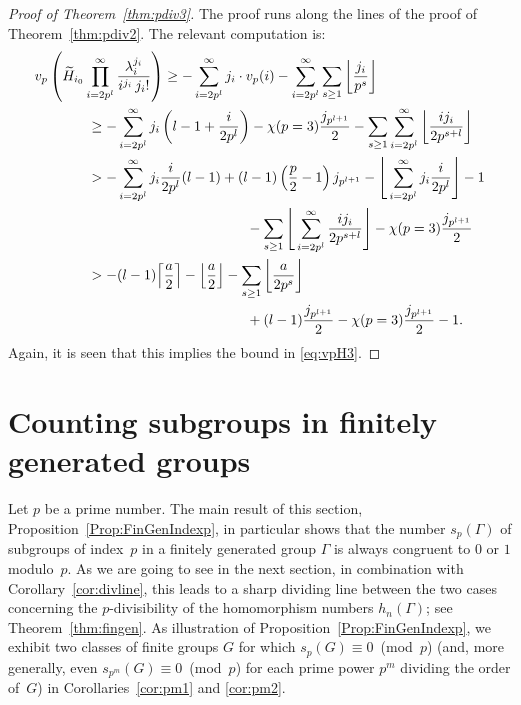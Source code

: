 \documentclass[12pt,reqno]{amsart}
\numberwithin{equation}{section}
\theoremstyle{remark}
\begin{document}
\begin{proof}[Proof of Theorem~{\em \ref{thm:pdiv3}}]
The proof runs along the lines of the proof of Theorem~\ref{thm:pdiv2}.
The relevant computation is:
\begin{align}
\notag
v_p&\left(\widetilde H_{i_0}
\prod _{i=2p^l} ^{\infty}
\frac {{\lambda}_i^{j_i}}
{i^{j_i}\,j_i!}\right)
\ge -\sum_{i=2p^l}^\infty j_i\cdot v_p(i)
-\sum_{i=2p^l}^\infty\sum_{s\ge1}{\left\lfloor{\frac {j_i} {p^s}}\right\rfloor}\\
\notag
&\kern1cm
\ge
-\sum_{i=2p^l}^\infty j_i\left(l-1+\frac {i} {2p^l}\right)
-\chi(p=3)\frac {j_{p^{l+1}}}2 
-\sum_{s\ge1}\sum_{i=2p^l}^\infty{\left\lfloor{\frac {ij_i} {2p^{s+l}}}\right\rfloor}\\
\notag
&\kern1cm
>
-\sum_{i=2p^l}^\infty j_i\frac {i} {2p^l}(l-1)
+(l-1)\left(\frac {p} {2}-1\right)j_{p^{l+1}}
-\Bigg\lfloor\sum_{i=2p^l}^\infty j_i\frac {i} {2p^l}\Bigg\rfloor-1\\
\notag
&\kern5cm
-\sum_{s\ge1}\Bigg\lfloor\sum_{i=2p^l}^\infty\frac {ij_i}
{2p^{s+l}}\Bigg\rfloor
-\chi(p=3)\frac {j_{p^{l+1}}}2\\
\notag
&\kern1cm
>
-(l-1){\left\lceil{\frac {a} {2}}\right\rceil}
-{\left\lfloor{\frac {a} {2}}\right\rfloor}
-\sum_{s\ge1}{\left\lfloor{\frac {a} {2p^{s}}}\right\rfloor}\\
&\kern5cm
+(l-1)\frac {j_{p^{l+1}}} {2}
-\chi(p=3)\frac {j_{p^{l+1}}}2
-1.
\label{eq:Hest3}
\end{align}
Again, it is seen that this implies the bound in \eqref{eq:vpH3}.
\end{proof}

\section{Counting subgroups in finitely generated groups}
\label{sec:fingen}

\noindent Let $p$ be a prime number.
The main result of this section, Proposition~\ref{Prop:FinGenIndexp},
in particular shows that the number $s_p(\Gamma)$ of subgroups of
index~$p$ in a finitely generated group $\Gamma$ is always congruent
to $0$ or $1$ modulo~$p$. As we are going to see in the next section, 
in combination with Corollary~\ref{cor:divline}, 
this leads to a sharp dividing line between
the two cases concerning the $p$-divisibility of the homomorphism
numbers $h_n(\Gamma)$; see Theorem~\ref{thm:fingen}. As illustration of
Proposition~\ref{Prop:FinGenIndexp}, we exhibit two classes of
finite groups $G$ for which $s_p(G)\equiv0$~(mod~$p$) (and, more
generally, even $s_{p^m}(G)\equiv0$~(mod~$p$) for each prime power
$p^m$ dividing the order of~$G$) in Corollaries~\ref{cor:pm1}
and \ref{cor:pm2}.
\end{document}
